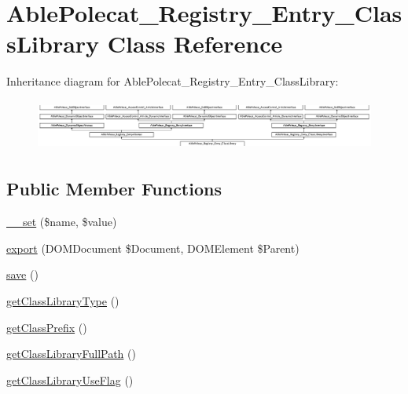 \hypertarget{class_able_polecat___registry___entry___class_library}{}\section{Able\+Polecat\+\_\+\+Registry\+\_\+\+Entry\+\_\+\+Class\+Library Class Reference}
\label{class_able_polecat___registry___entry___class_library}
Inheritance diagram for Able\+Polecat\+\_\+\+Registry\+\_\+\+Entry\+\_\+\+Class\+Library\+:\begin{figure}[H]
\begin{center}
\leavevmode
\includegraphics[height=1.707317cm]{class_able_polecat___registry___entry___class_library}
\end{center}
\end{figure}
\subsection*{Public Member Functions}
\begin{DoxyCompactItemize}
\item 
\hyperlink{class_able_polecat___registry___entry___class_library_a83c2703c91959192f759992ad5640b67}{\+\_\+\+\_\+set} (\$name, \$value)
\item 
\hyperlink{class_able_polecat___registry___entry___class_library_a0a05b2e4b3a44390eeb042064e427b1a}{export} (D\+O\+M\+Document \$Document, D\+O\+M\+Element \$Parent)
\item 
\hyperlink{class_able_polecat___registry___entry___class_library_afc8a3c62679cf00ade9f15fb2a6d6132}{save} ()
\item 
\hyperlink{class_able_polecat___registry___entry___class_library_a78da81e3fa32c22602195abcf4c21d3c}{get\+Class\+Library\+Type} ()
\item 
\hyperlink{class_able_polecat___registry___entry___class_library_a2b16efeebea2966b34d452b3f53c4aea}{get\+Class\+Prefix} ()
\item 
\hyperlink{class_able_polecat___registry___entry___class_library_a826677cf6939d076fd64c902ba6c0217}{get\+Class\+Library\+Full\+Path} ()
\item 
\hyperlink{class_able_polecat___registry___entry___class_library_af40e03caa4b08fe0b0a39031aa87bd81}{get\+Class\+Library\+Use\+Flag} ()
\end{DoxyCompactItemize}
